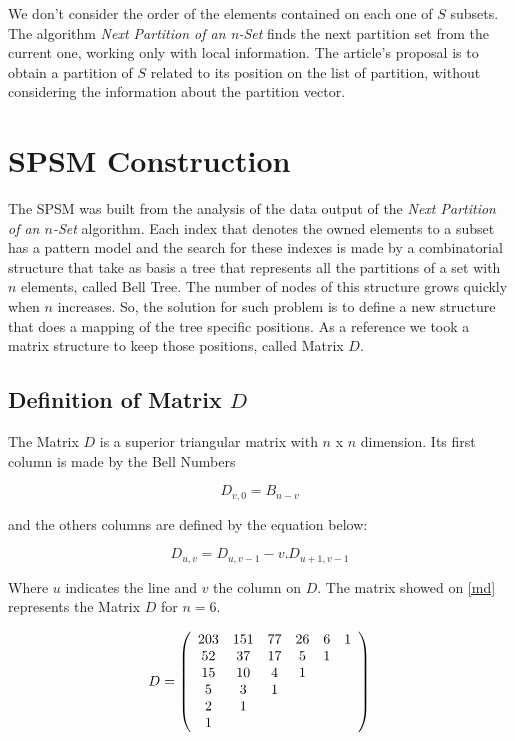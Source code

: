 \documentclass {amsart}
\begin{document}
We don't consider the order of the elements contained on each one
of {$S$} subsets. The algorithm \emph{Next Partition of an
n-Set}\cite{wi} finds the next partition set from the current one,
working only with local information. The article's proposal is to
obtain a partition of {$S$} related to its position on the list of
partition, without considering the information about the partition
vector.

\section*{SPSM Construction}

The SPSM was built from the analysis of the data output of the
\emph{Next Partition of an {$n$}-Set} algorithm. Each index that
denotes the owned elements to a subset has a pattern model and the
search for these indexes is made by a combinatorial structure that
take as basis a tree that represents all the partitions of a set
with {$n$} elements, called Bell Tree\cite{me}. The number of
nodes of this structure grows quickly when {$n$} increases. So,
the solution for such problem is to define a new structure that
does a mapping of the tree specific positions. As a reference we
took a matrix structure to keep those positions, called Matrix
{$D$}.


\subsection*{Definition of Matrix {$D$}}

The Matrix {$D$} is a superior triangular matrix with {$n$} x
{$n$} dimension. Its first column is made by the Bell
Numbers\cite{me}

\begin{equation}
    D_{v,0} = B_{n-v}
\end{equation}

and the others columns are defined by the equation below:

\begin{equation}
    D_{u,v} = D_{u,v-1} - v.D_{u+1,v-1}
\end{equation}

Where {$u$} indicates the line and {$v$} the column on {$D$}. The
matrix showed on \ref{md} represents the Matrix {$D$} for {$n=6$}.

\begin{equation} \label{md}
D = \left(\begin{array}{c c c c c c}
203 & 151 & 77 & 26 & 6 & 1 \\
52  & 37  & 17 & 5  & 1 &     \\
15  & 10  & 4  & 1  &   &     \\
5   & 3   & 1  &    &     &   \\
2   & 1   &      &      &     &   \\
1   &         &      &      &       &   \\
\end{array}\right)
\end{equation}
\end{document}
